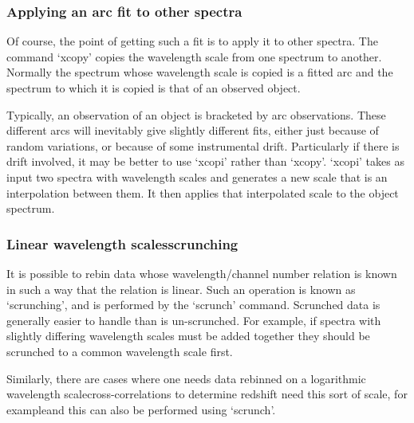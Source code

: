 
\subsubsection{\label{techno8xcopy}Applying an arc fit to other spectra}

   Of course, the point of getting such a fit is to apply it to other
   spectra.  The command `xcopy' copies the wavelength scale from one
   spectrum to another.  Normally the spectrum whose wavelength scale is
   copied is a fitted arc and the spectrum to which it is copied is that
   of an observed object.

   Typically, an observation of an object is bracketed by arc
   observations. These different arcs will inevitably give slightly
   different fits, either just because of random variations, or because
   of some instrumental drift. Particularly if there is drift involved,
   it may be better to use `xcopi' rather than `xcopy'.  `xcopi' takes
   as input two spectra with wavelength scales and generates a new scale
   that is an interpolation between them.  It then applies that
   interpolated scale to the object spectrum.


\subsubsection{\label{techno8scrunch}Linear wavelength
   scales\latorhtm{---}{-}scrunching}

   It is possible to rebin data whose wavelength/channel number relation
   is known in such a way that the relation is linear.  Such an
   operation is known as `scrunching', and is performed by the `scrunch'
   command. Scrunched data is generally easier to handle than is
   un-scrunched.  For example, if spectra with slightly differing
   wavelength scales must be added together they should be scrunched to
   a common wavelength scale first.

   Similarly, there are cases where one needs data rebinned on a
   logarithmic wavelength scale\latorhtm{---}{-}cross-correlations to determine
   redshift need this sort of scale, for example\latorhtm{---}{-}and this can
   also be performed using `scrunch'.

